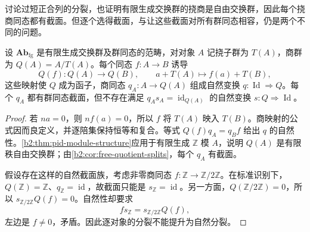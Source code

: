 \ProseParagraphBreak
{}讨论过短正合列的分裂，也证明有限生成交换群的挠商是自由交换群，因此每个挠商同态都有截面。但逐个选得截面，与让这些截面对所有群同态相容，仍是两个不同的问题。

\begin{proposition}\label{b2:prop:no-natural-torsion-splitting}
	设 \(\mathbf{Ab}_{\mathrm{fg}}\) 是有限生成交换群及群同态的范畴，对对象 \(A\) 记挠子群为 \(T(A)\)，商群为 \(Q(A)=A/T(A)\)。每个同态 \(f:A\to B\) 诱导
	\[
		Q(f):Q(A)\to Q(B),\qquad a+T(A)\longmapsto f(a)+T(B),
	\]
	这些映射使 \(Q\) 成为函子，商同态 \(q_A:A\to Q(A)\) 组成自然变换 \(q:\operatorname{Id}\Rightarrow Q\)。每个 \(q_A\) 都有群同态截面，但不存在满足 \(q_As_A=\operatorname{id}_{Q(A)}\) 的自然变换 \(s:Q\Rightarrow\operatorname{Id}\)。
\end{proposition}
\begin{proof}
	若 \(na=0\)，则 \(nf(a)=0\)，所以 \(f\) 将 \(T(A)\) 映入 \(T(B)\)。商映射的公式因而良定义，并逐陪集保持恒等和复合。等式 \(Q(f)q_A=q_Bf\) 给出 \(q\) 的自然性。\cref{b2:thm:pid-module-structure}应用于有限生成 \(\mathbb Z\) 模 \(A\)，说明 \(Q(A)\) 是有限秩自由交换群；由\cref{b2:cor:free-quotient-splits}，每个 \(q_A\) 有截面。

	假设存在这样的自然截面族，考虑非零商同态 \(f:\mathbb Z\to\mathbb Z/2\mathbb Z\)。在标准识别下，\(Q(\mathbb Z)=\mathbb Z\)、\(q_{\mathbb Z}=\operatorname{id}\)，故截面只能是 \(s_{\mathbb Z}=\operatorname{id}\)。另一方面，\(Q(\mathbb Z/2\mathbb Z)=0\)，所以 \(s_{\mathbb Z/2\mathbb Z}Q(f)=0\)。自然性却要求
	\[
		fs_{\mathbb Z}=s_{\mathbb Z/2\mathbb Z}Q(f),
	\]
	左边是 \(f\ne0\)，矛盾。因此逐对象的分裂不能提升为自然分裂。
\end{proof}
